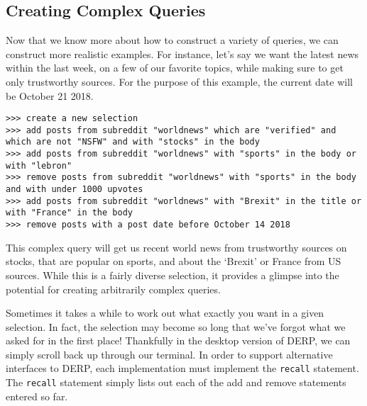 \subsection{Creating Complex Queries}

Now that we know more about how to construct a variety of queries, we can construct more realistic examples. For instance, let’s say we want the latest news within the last week, on a few of our favorite topics, while making sure to get only trustworthy sources. For the purpose of this example, the current date will be October 21 2018.
\newline\begin{minipage}{\linewidth}\begin{lstlisting}
>>> create a new selection
>>> add posts from subreddit "worldnews" which are "verified" and which are not "NSFW" and with "stocks" in the body
>>> add posts from subreddit "worldnews" with "sports" in the body or with "lebron"
>>> remove posts from subreddit "worldnews" with "sports" in the body and with under 1000 upvotes
>>> add posts from subreddit "worldnews" with "Brexit" in the title or with "France" in the body
>>> remove posts with a post date before October 14 2018
\end{lstlisting}\end{minipage}
This complex query will get us recent world news from trustworthy sources on stocks, that are popular on sports, and about the ‘Brexit’ or France from US sources. While this is a fairly diverse selection, it provides a glimpse into the potential for creating arbitrarily complex queries.

Sometimes it takes a while to work out what exactly you want in a given selection. In fact, the selection may become so long that we’ve forgot what we asked for in the first place! Thankfully in the desktop version of DERP, we can simply scroll back up through our terminal. In order to support alternative interfaces to DERP, each implementation must implement the \texttt{recall} statement. The \texttt{recall} statement simply lists out each of the add and remove statements entered so far.
